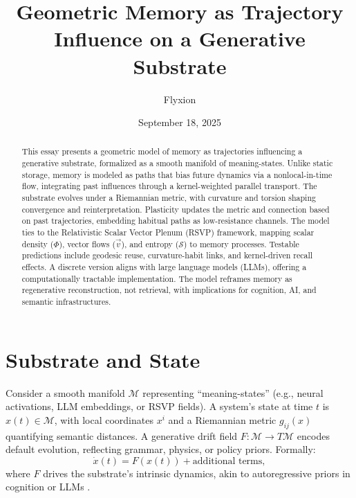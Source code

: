 \documentclass[a4paper,12pt]{article}
\newcommand{\M}{\mathcal{M}}
\newcommand{\Scal}{\mathcal{S}}
\newcommand{\vvec}{\vec{v}}
\begin{document}
\title{Geometric Memory as Trajectory Influence on a Generative Substrate}
\author{Flyxion}
\date{September 18, 2025}
\maketitle

\begin{abstract}
This essay presents a geometric model of memory as trajectories influencing a generative substrate, formalized as a smooth manifold of meaning-states. Unlike static storage, memory is modeled as paths that bias future dynamics via a nonlocal-in-time flow, integrating past influences through a kernel-weighted parallel transport. The substrate evolves under a Riemannian metric, with curvature and torsion shaping convergence and reinterpretation. Plasticity updates the metric and connection based on past trajectories, embedding habitual paths as low-resistance channels. The model ties to the Relativistic Scalar Vector Plenum (RSVP) framework, mapping scalar density ($\Phi$), vector flows ($\vvec$), and entropy ($\Scal$) to memory processes. Testable predictions include geodesic reuse, curvature-habit links, and kernel-driven recall effects. A discrete version aligns with large language models (LLMs), offering a computationally tractable implementation. The model reframes memory as regenerative reconstruction, not retrieval, with implications for cognition, AI, and semantic infrastructures.
\end{abstract}

\section{Substrate and State}
Consider a smooth manifold $\M$ representing ``meaning-states'' (e.g., neural activations, LLM embeddings, or RSVP fields). A system’s state at time $t$ is $x(t) \in \M$, with local coordinates $x^i$ and a Riemannian metric $g_{ij}(x)$ quantifying semantic distances. A generative drift field $F: \M \to T\M$ encodes default evolution, reflecting grammar, physics, or policy priors. Formally:
\[
\dot{x}(t) = F(x(t)) + \text{additional terms},
\]
where $F$ drives the substrate’s intrinsic dynamics, akin to autoregressive priors in cognition or LLMs \citep{vaswani2017attention}.
\end{document}
